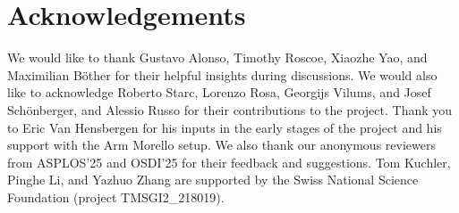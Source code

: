 \documentclass[sigplan,10pt]{acmart}
\begin{document}
\section{Acknowledgements}

We would like to thank Gustavo Alonso, Timothy Roscoe, Xiaozhe Yao, and Maximilian Böther for their helpful insights during discussions. We would also like to acknowledge
Roberto Starc, Lorenzo Rosa, Georgijs Vilums, and Josef Schönberger, and Alessio Russo for their contributions to the project. Thank you to Eric Van Hensbergen for his inputs in the early stages of the project and his support with the Arm Morello setup.
We also thank our anonymous reviewers from ASPLOS'25 and OSDI'25 for their feedback and suggestions. Tom Kuchler, Pinghe Li, and Yazhuo Zhang are supported by the Swiss National Science Foundation (project TMSGI2\_218019).


\end{document}
